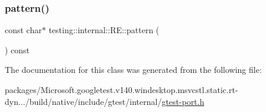 \subsubsection{\texorpdfstring{pattern()}{pattern()}}
{\footnotesize\ttfamily const char$\ast$ testing\+::internal\+::\+R\+E\+::pattern (\begin{DoxyParamCaption}{ }\end{DoxyParamCaption}) const\hspace{0.3cm}{\ttfamily [inline]}}



The documentation for this class was generated from the following file\+:\begin{DoxyCompactItemize}
\item 
packages/\+Microsoft.\+googletest.\+v140.\+windesktop.\+msvcstl.\+static.\+rt-\/dyn.../build/native/include/gtest/internal/\mbox{\hyperlink{gtest-port_8h}{gtest-\/port.\+h}}\end{DoxyCompactItemize}

